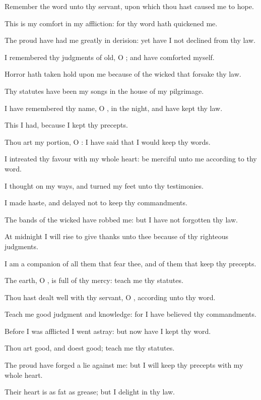 \Verse Remember the word unto thy servant, upon which thou hast caused me to hope.

\Verse This is my comfort in my affliction: for thy word hath quickened me.

\Verse The proud have had me greatly in derision: yet have I not declined from thy law.

\Verse I remembered thy judgments of old, O \LORD; and have comforted myself.

\Verse Horror hath taken hold upon me because of the wicked that forsake thy law.

\Verse Thy statutes have been my songs in the house of my pilgrimage.

\Verse I have remembered thy name, O \LORD, in the night, and have kept thy law.

\Verse This I had, because I kept thy precepts.

\Verse Thou art my portion, O \LORD: I have said that I would keep thy words.

\Verse I intreated thy favour with my whole heart: be merciful unto me according to thy word.

\Verse I thought on my ways, and turned my feet unto thy testimonies.

\Verse I made haste, and delayed not to keep thy commandments.

\Verse The bands of the wicked have robbed me: but I have not forgotten thy law.

\Verse At midnight I will rise to give thanks unto thee because of thy righteous judgments.

\Verse I am a companion of all them that fear thee, and of them that keep thy precepts.

\Verse The earth, O \LORD, is full of thy mercy: teach me thy statutes.

\Verse Thou hast dealt well with thy servant, O \LORD, according unto thy word.

\Verse Teach me good judgment and knowledge: for I have believed thy commandments.

\Verse Before I was afflicted I went astray: but now have I kept thy word.

\Verse Thou art good, and doest good; teach me thy statutes.

\Verse The proud have forged a lie against me: but I will keep thy precepts with my whole heart.

\Verse Their heart is as fat as grease; but I delight in thy law.

